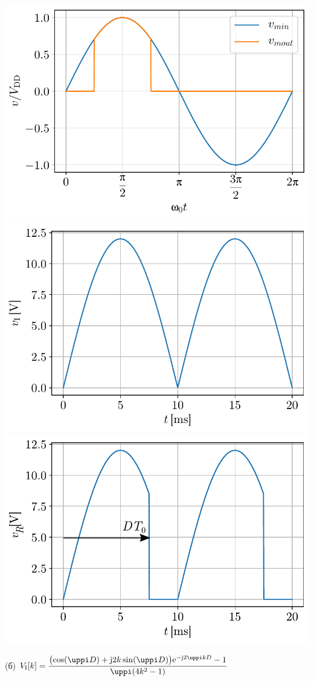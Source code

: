 \begin{center}
    \includegraphics[scale=0.4]{fig/T2_a.pdf}
    \includegraphics[scale=0.4]{fig/T2_b.pdf} \\
    \includegraphics[scale=0.4]{fig/T2_c.pdf} \\
\end{center}
(б) $V_{\rm I}[k] = 
\dfrac{
\bigl(
\cos(\uppi D) + 
{\rm j}2k \sin(\uppi D) 
\bigr)
{\rm e}^{-{\rm j}2\uppi kD }
-1 }{\uppi(4k^2 - 1)}$